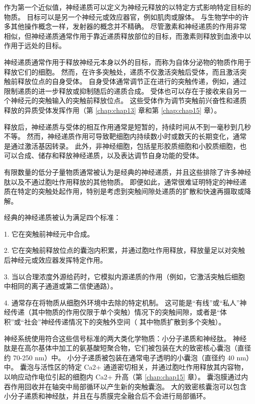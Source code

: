 作为第一个近似值，神经递质可以定义为神经元释放的以特定方式影响特定目标的物质。 
目标可以是另一个神经元或效应器官，例如肌肉或腺体。 
与生物学中的许多其他操作概念一样，发射器的概念并不精确。 
尽管激素和神经递质的作用非常相似，但神经递质通常作用于靠近递质释放部位的目标，而激素则释放到血液中以作用于远处的目标。


神经递质通常作用于释放神经元本身以外的目标，而称为自体分泌物的物质作用于释放它们的细胞。 
然而，在许多突触处，递质不仅激活突触后受体，而且激活突触前释放位点的自身受体。 
自身受体通常调节正在进行的突触传递，例如，通过限制递质的进一步释放或抑制随后的递质合成。 
受体也可以存在于接收来自另一个神经元的突触输入的突触前释放位点。 
这些受体作为调节突触前兴奋性和递质释放的异质受体发挥作用（第 \ref{chap:chap13} 章和第 \ref{chap:chap15} 章）。


释放后，神经递质与受体的相互作用通常是短暂的，持续时间从不到一毫秒到几秒不等。 
然而，神经递质作用可导致靶细胞内持续数小时或数天的长期变化，通常是通过激活基因转录。 
此外，非神经细胞，包括星形胶质细胞和小胶质细胞，也可以合成、储存和释放神经递质，以及表达调节自身功能的受体。


有限数量的低分子量物质通常被认为是经典的神经递质，并且这些排除了许多神经肽以及不通过胞吐作用释放的其他物质。 
即便如此，通常很难证明特定的神经递质在特定的突触处起作用，特别是考虑到突触间隙处递质的扩散和快速再摄取或降解。


经典的神经递质被认为满足四个标准：

1. 它在突触前神经元中合成。 

2. 它在突触前释放位点的囊泡内积累，并通过胞吐作用释放，释放量足以对突触后神经元或效应器发挥特定作用。 

3. 当以合理浓度外源给药时，它模拟内源递质的作用（例如，它激活突触后细胞中相同的离子通道或第二信使通路）。 

4. 通常存在将物质从细胞外环境中去除的特定机制。 这可能是“有线”或“私人”神经传递（其中物质的作用仅限于单个突触）情况下的突触间隙，或者是“体积”或“社会”神经传递情况下的突触外空间（ 其中物质扩散到多个突触）。

神经系统使用符合这些信号标准的两大类化学物质：小分子递质和神经肽。 
神经肽是在高尔基体中加工的氨基酸短聚合物，它们被包装在大的致密核心囊泡（直径约 70-250 nm）中。 
小分子递质被包装在通常电子透明的小囊泡（直径约 40 nm）中。 
囊泡与活性区的特定 Ca2+ 通道密切相关，并通过胞吐作用释放其内容物，以响应动作电位引起的细胞内 Ca2+ 升高（第 \ref{chap:chap15} 章）。 
囊泡膜通过内吞作用回收并在轴突中局部循环以产生新的突触囊泡。 
大的致密核囊泡可以包含小分子递质和神经肽，并且在与质膜完全融合后不会进行局部循环。



